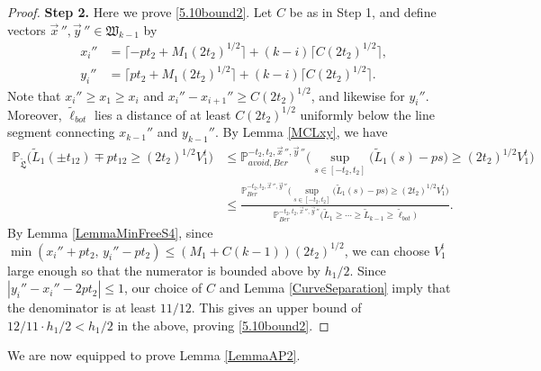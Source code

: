 \begin{proof}
	\noindent\textbf{Step 2.} Here we prove \eqref{5.10bound2}. Let $C$ be as in Step 1, and define vectors $\vec{x}\,'', \vec{y}\,''\in\mathfrak{W}_{k-1}$ by
	\begin{align*}
	x_i'' &= \lceil -pt_2 + M_1(2t_2)^{1/2}\rceil + (k-i)\lceil C(2t_2)^{1/2}\rceil,\\
	y_i'' &= \lceil pt_2 + M_1(2t_2)^{1/2}\rceil + (k-i)\lceil C(2t_2)^{1/2}\rceil.
	\end{align*}
	Note that $x_i'' \geq x_1 \geq x_i$ and $x_i''-x_{i+1}'' \geq C(2t_2)^{1/2}$, and likewise for $y_i''$. Moreover, $\tilde{\ell}_{bot}$ lies a distance of at least $C(2t_2)^{1/2}$ uniformly below the line segment connecting $x_{k-1}''$ and $y_{k-1}''$. By Lemma \ref{MCLxy}, we have
	\begin{align*}
	\mathbb{P}_{\tilde{\mathfrak{L}}}\Big(\tilde{L}_1(\pm t_{12}) \mp pt_{12} \geq (2t_2)^{1/2}V_1^t\Big) &\leq \mathbb{P}^{-t_2,t_2,\vec{x}\,'',\vec{y}\,''}_{avoid,Ber}\Big(\sup_{s\in[-t_2,t_2]} \big(\tilde{L}_1(s)-ps\big) \geq (2t_2)^{1/2}V_1^t\Big)\\
	&\leq \frac{\mathbb{P}^{-t_2,t_2,\vec{x}\,'',\vec{y}\,''}_{Ber}\Big(\sup_{s\in[-t_2,t_2]} \big(\tilde{L}_1(s)-ps\big) \geq (2t_2)^{1/2}V_1^t\Big)}{\mathbb{P}^{-t_2,t_2,\vec{x}\,'',\vec{y}\,''}_{Ber}\big(\tilde{L}_1\geq\cdots\geq\tilde{L}_{k-1}\geq\tilde{\ell}_{bot}\big)}.
	\end{align*}
	By Lemma \ref{LemmaMinFreeS4}, since $\min(x_i'' + pt_2, \, y_i'' - pt_2) \leq (M_1+C(k-1))(2t_2)^{1/2}$, we can choose $V_1^t$ large enough so that the numerator is bounded above by $h_1/2$. Since $|y_i'' - x_i'' - 2pt_2| \leq 1$, our choice of $C$ and Lemma \ref{CurveSeparation} imply that the denominator is at least $11/12$. This gives an upper bound of $12/11\cdot h_1/2 < h_1/2$ in the above, proving \eqref{5.10bound2}.
	
	
\end{proof}

We are now equipped to prove Lemma \ref{LemmaAP2}.

